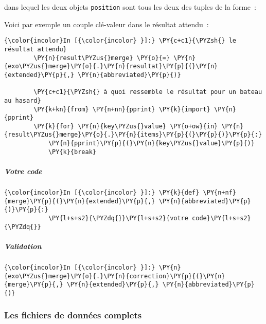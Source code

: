 dans lequel les deux objets \texttt{position} sont tous les deux des
tuples de la forme~:

\begin{Shaded}
\begin{Highlighting}[]
\end{Highlighting}
\end{Shaded}

    Voici par exemple un couple clé-valeur dans le résultat attendu~:

    \begin{Verbatim}[commandchars=\\\{\}]
{\color{incolor}In [{\color{incolor} }]:} \PY{c+c1}{\PYZsh{} le résultat attendu}
        \PY{n}{result\PYZus{}merge} \PY{o}{=} \PY{n}{exo\PYZus{}merge}\PY{o}{.}\PY{n}{resultat}\PY{p}{(}\PY{n}{extended}\PY{p}{,} \PY{n}{abbreviated}\PY{p}{)}
        
        \PY{c+c1}{\PYZsh{} à quoi ressemble le résultat pour un bateau au hasard}
        \PY{k+kn}{from} \PY{n+nn}{pprint} \PY{k}{import} \PY{n}{pprint}
        \PY{k}{for} \PY{n}{key\PYZus{}value} \PY{o+ow}{in} \PY{n}{result\PYZus{}merge}\PY{o}{.}\PY{n}{items}\PY{p}{(}\PY{p}{)}\PY{p}{:}
            \PY{n}{pprint}\PY{p}{(}\PY{n}{key\PYZus{}value}\PY{p}{)}
            \PY{k}{break}
\end{Verbatim}


    \hypertarget{votre-code}{%
\subparagraph{Votre code}\label{votre-code}}

    \begin{Verbatim}[commandchars=\\\{\}]
{\color{incolor}In [{\color{incolor} }]:} \PY{k}{def} \PY{n+nf}{merge}\PY{p}{(}\PY{n}{extended}\PY{p}{,} \PY{n}{abbreviated}\PY{p}{)}\PY{p}{:}
            \PY{l+s+s2}{\PYZdq{}}\PY{l+s+s2}{votre code}\PY{l+s+s2}{\PYZdq{}}
\end{Verbatim}


    \hypertarget{validation}{%
\subparagraph{Validation}\label{validation}}

    \begin{Verbatim}[commandchars=\\\{\}]
{\color{incolor}In [{\color{incolor} }]:} \PY{n}{exo\PYZus{}merge}\PY{o}{.}\PY{n}{correction}\PY{p}{(}\PY{n}{merge}\PY{p}{,} \PY{n}{extended}\PY{p}{,} \PY{n}{abbreviated}\PY{p}{)}
\end{Verbatim}

\newpage
    \hypertarget{les-fichiers-de-donnuxe9es-complets}{%
\subsubsection{Les fichiers de données
complets}\label{les-fichiers-de-donnuxe9es-complets}}

